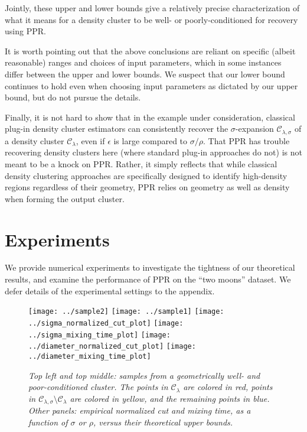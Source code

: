 \documentclass[11pt,twoside]{article}
\newcommand{\1}{\mathbf{1}}
\newcommand{\mc}[1]{\mathcal{#1}}
\begin{document}
Jointly, these upper and lower bounds give a relatively precise characterization
of what it means for a density cluster to be well- or poorly-conditioned for recovery using PPR. 

\begin{remark}
	It is worth pointing out that the above conclusions are reliant on specific
	(albeit reasonable) ranges and choices of input parameters, which in some
	instances differ between the upper and lower bounds. We suspect that our lower
	bound continues to hold even when choosing input parameters as dictated by our
	upper bound, but do not pursue the details.
\end{remark}

Finally, it is not hard to show that in the example under consideration, classical
plug-in density cluster estimators can consistently recover the
$\sigma$-expansion $\mc{C}_{\lambda,\sigma}$ of a density cluster $\mc{C}_{\lambda}$, even if $\epsilon$ is
large compared to $\sigma/\rho$. That PPR has trouble recovering density
clusters here (where standard plug-in approaches do not) is not meant to
be a knock on PPR. Rather, it simply reflects that while classical density
clustering approaches are specifically designed to identify high-density regions
regardless of their geometry, PPR relies on geometry as well as density when
forming the output cluster. 

\section{Experiments}
\label{sec:experiments}

We provide numerical experiments to investigate the tightness of our theoretical results, and examine the performance of PPR on the ``two moons'' dataset. We defer details of the experimental settings to the appendix.   

\begin{figure}[tb]
	\centering
	\texttt{[image: ../sample2]}
	\texttt{[image: ../sample1]}
	\texttt{[image: ../sigma\_normalized\_cut\_plot]}
	\texttt{[image: ../sigma\_mixing\_time\_plot]}
	\texttt{[image: ../diameter\_normalized\_cut\_plot]}
	\texttt{[image: ../diameter\_mixing\_time\_plot]}
	\caption{\it\small Top left and top middle: samples from a geometrically
		well- and poor-conditioned cluster. The points in $\mc{C}_{\lambda}$ are colored in red, points in $\mc{C}_{\lambda,\sigma} \!\setminus\! \mc{C}_{\lambda}$ are colored in yellow, and the remaining points in blue. Other panels: empirical normalized cut and mixing time, as a function of $\sigma$ or $\rho$, versus their theoretical upper bounds.} 
	\label{fig:bounds}
\end{figure}
\end{document}
